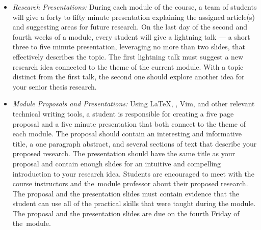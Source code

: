 \begin{itemize}

\item {\em Research Presentations:} During each module of the course, a team of students will give a forty to fifty
  minute presentation explaining the assigned article(s) and suggesting areas for future research. On the last day of
  the second and fourth weeks of a module, every student will give a lightning talk --- a short three to five minute
  presentation, leveraging no more than two slides, that effectively describes the topic. The first lightning talk must
  suggest a new research idea connected to the theme of the current module. With a topic distinct from the first talk,
  the second one should explore another idea for your senior thesis research.


\item {\em Module Proposals and Presentations:} Using \LaTeX, \BibTeX, Vim, and other relevant technical writing tools,
  a student is responsible for creating a five page proposal and a five minute presentation that both connect to the
  theme of each module. The proposal should contain an interesting and informative title, a one paragraph abstract,
  and several sections of text that describe your proposed research. The presentation should have the same title as
  your proposal and contain enough slides for an intuitive and compelling introduction to your research idea.  Students
  are encouraged to meet with the course instructors and \mbox{the module} professor about their proposed research.
  The proposal and the presentation slides must contain evidence that the student can use all of the practical skills
  that were taught during the module.  The proposal and the presentation slides are due on the fourth Friday of \mbox{the
  module}.




\end{itemize}
